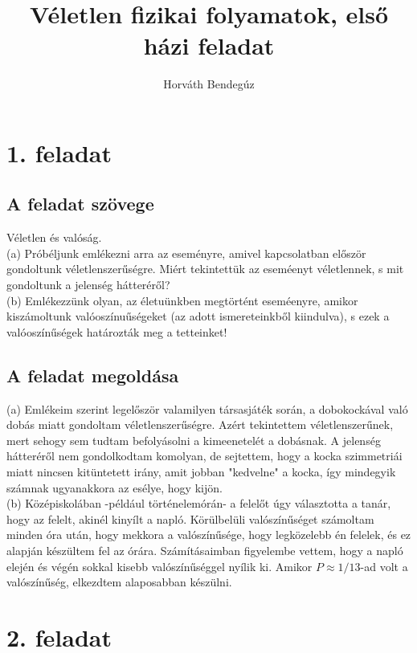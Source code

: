 \documentclass[12pt]{article}
\title{Véletlen fizikai folyamatok, első házi feladat}
\author{Horváth Bendegúz}
\begin{document}
 
 
\maketitle
\section*{1. feladat}
\subsection*{A feladat szövege}
Véletlen és valóság.\\
(a) Próbéljunk emlékezni arra az eseményre, amivel kapcsolatban először gondoltunk véletlenszerűségre. Miért tekintettük az eseméenyt véletlennek, s mit gondoltunk a jelenség hátteréről?
\\(b) Emlékezzünk olyan, az életuünkben megtörtént eseméenyre, amikor kiszámoltunk valóoszínuűségeket (az adott ismereteinkből kiindulva), s ezek a valóoszínűségek határozták meg a tetteinket!
\subsection*{A feladat megoldása}
(a) Emlékeim szerint legelőször valamilyen társasjáték során, a dobokockával való dobás miatt gondoltam véletlenszerűségre. Azért tekintettem véletlenszerűnek, mert sehogy sem tudtam befolyásolni a kimeenetelét a dobásnak. A jelenség hátteréről nem gondolkodtam komolyan, de sejtettem, hogy a kocka szimmetriái miatt nincsen kitüntetett irány, amit jobban "kedvelne" a kocka, így mindegyik számnak ugyanakkora az esélye, hogy kijön.\\
(b) Középiskolában -például történelemórán- a felelőt úgy választotta a tanár, hogy az felelt, akinél kinyílt a napló. Körülbelüli valószínűséget számoltam minden óra után, hogy mekkora a valószínűsége, hogy legközelebb én felelek, és ez alapján készültem fel az órára. Számításaimban figyelembe vettem, hogy a napló elején és végén sokkal kisebb valószínűséggel nyílik ki. Amikor $P\approx 1/13$-ad volt a valószínűség, elkezdtem alaposabban készülni. 
\newpage
\section*{2. feladat}
\end{document}
